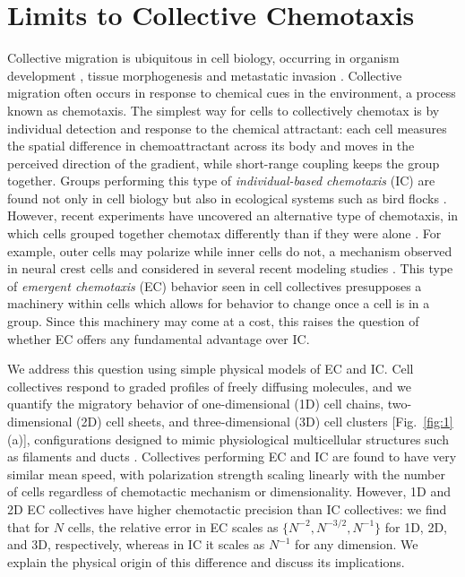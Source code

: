 
\chapter{Limits to Collective Chemotaxis}

Collective migration is ubiquitous in cell biology, occurring in organism development \cite{theveneau2010collective,cai2016modeling,bianco2007two,montell2008morphogenetic},
tissue morphogenesis \cite{ellison2016cell} and metastatic invasion
\cite{kim2013cooperative,friedl2009collective,friedl2012classifying,deisboeck2009collective}.
Collective migration often occurs in response to chemical cues in the environment, a process known as chemotaxis. The simplest way for cells to collectively chemotax is by individual detection and response to the chemical attractant: each cell measures the spatial difference in chemoattractant across its body and moves in the perceived direction of the gradient, while short-range coupling keeps the group together. Groups performing this type of \textit{individual-based chemotaxis} (IC) are found not only in cell biology \cite{kulesa1998neural} but also in ecological systems such as bird flocks \cite{simons2004many}.
However, recent experiments have uncovered an alternative type of chemotaxis, in which cells grouped together chemotax differently than if they were alone \cite{haeger2015collective,malet2015collective,leber2009molecular,gaggioli2007fibroblast}.
For example, outer cells may polarize while inner cells do not, a mechanism observed in neural crest cells \cite{theveneau2010collective} and considered in several recent modeling studies
\cite{malet2015collective,camley2016emergent,varennes2016collective}. This type of \textit{emergent chemotaxis} (EC) behavior seen in cell collectives presupposes a machinery within cells which allows for behavior to change once a cell is in a group. Since this machinery may come at a cost, this raises the question of whether EC offers any fundamental advantage over IC.

We address this question using simple physical models of EC and IC. Cell collectives respond to graded profiles of freely diffusing molecules, and we quantify the migratory behavior of one-dimensional (1D) cell chains, two-dimensional (2D) cell sheets, and three-dimensional (3D) cell clusters [Fig.\ \ref{fig:1}(a)], configurations designed to mimic physiological multicellular structures such as filaments and ducts \cite{cheung2013collective,friedl2009collective,bardeesy2002pancreatic}. Collectives performing EC and IC are found to have very similar mean speed, with polarization strength scaling linearly with the number of cells regardless of chemotactic mechanism or dimensionality. However, 1D and 2D EC collectives have higher chemotactic precision than IC collectives: we find that for $N$ cells, the relative error in EC scales as
$\{N^{-2}, N^{-3/2}, N^{-1}\}$ for 1D, 2D, and 3D, respectively, whereas in IC it scales as $N^{-1}$ for any dimension. We explain the physical origin of this difference and discuss its implications.

